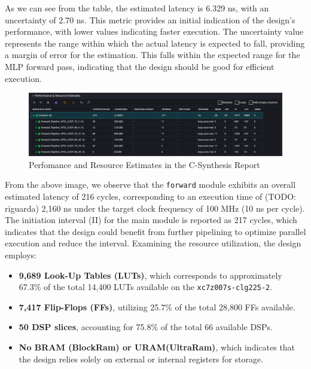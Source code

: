 \documentclass{article}
\begin{document}
As we can see from the table, the estimated latency is 6.329 ns, with an uncertainty of 2.70 ns. This metric provides an initial indication of the design's performance, with lower values indicating faster execution. The uncertainty value represents the range within which the actual latency is expected to fall, providing a margin of error for the estimation. This falls within the expected range for the MLP forward pass, indicating that the design should be good for efficient execution.

\begin{figure}[H]
    \centering
    \includegraphics[width=1\textwidth]{./assets/MLP/c-synthesis-performanceandresourceestimaes.png}
    \caption{Perfomance and Resource Estimates in the C-Synthesis Report}
    \label{fig:c-synthesis-performance-resources}
\end{figure}

From the above image, we observe that the \texttt{forward} module exhibits an overall estimated latency of 216 cycles, corresponding to an execution time of (TODO: riguarda) 2,160 ns under the target clock frequency of 100 MHz (10 ns per cycle). The initiation interval (II) for the main module is reported as 217 cycles, which indicates that the design could benefit from further pipelining to optimize parallel execution and reduce the interval. Examining the resource utilization, the design employs:
\begin{itemize}
    \item \textbf{9,689 Look-Up Tables (LUTs)}, which corresponds to approximately 67.3\% of the total 14,400 LUTs available on the \texttt{xc7z007s-clg225-2}.
    \item \textbf{7,417 Flip-Flops (FFs)}, utilizing 25.7\% of the total 28,800 FFs available.
    \item \textbf{50 DSP slices}, accounting for 75.8\% of the total 66 available DSPs.
    \item \textbf{No BRAM (BlockRam) or URAM(UltraRam)}, which indicates that the design relies solely on external or internal registers for storage.
\end{itemize}
\end{document}
